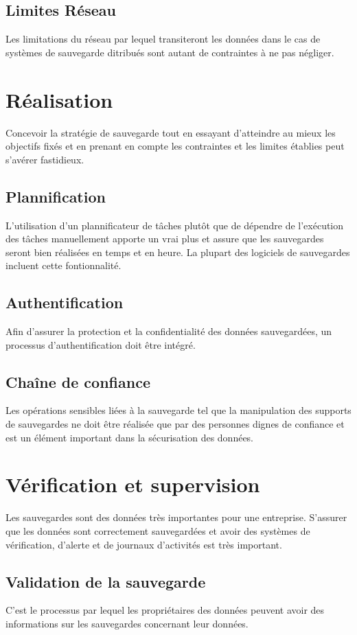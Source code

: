 \documentclass[a4paper,11pt]{report}
\begin{document}
\subsection{Limites Réseau}
Les limitations du réseau par lequel transiteront les données dans le cas de systèmes de sauvegarde ditribués sont autant de contraintes à ne pas négliger.

\section{Réalisation}
Concevoir la stratégie de sauvegarde tout en essayant d'atteindre au mieux les objectifs fixés et en prenant en compte les contraintes et les limites établies peut s'avérer fastidieux.

\subsection{Plannification}
L'utilisation d'un plannificateur de tâches plutôt que de dépendre de l'exécution des tâches manuellement apporte un vrai plus et assure que les sauvegardes seront bien réalisées en temps et en heure.
La plupart des logiciels de sauvegardes incluent cette fontionnalité.

\subsection{Authentification}
Afin d'assurer la protection et la confidentialité des données sauvegardées, un processus d'authentification doit être intégré.

\subsection{Chaîne de confiance}
Les opérations sensibles liées à la sauvegarde tel que la manipulation des supports de sauvegardes ne doit être réalisée que par des personnes dignes de confiance et est un élément important dans la sécurisation des données.

\section{Vérification et supervision}
Les sauvegardes sont des données très importantes pour une entreprise. S'assurer que les données sont correctement sauvegardées et avoir des systèmes de vérification, d'alerte et de journaux d'activités est très important.

\subsection{Validation de la sauvegarde}
C'est le processus par lequel les propriétaires des données peuvent avoir des informations sur les sauvegardes concernant leur données.
\end{document}
